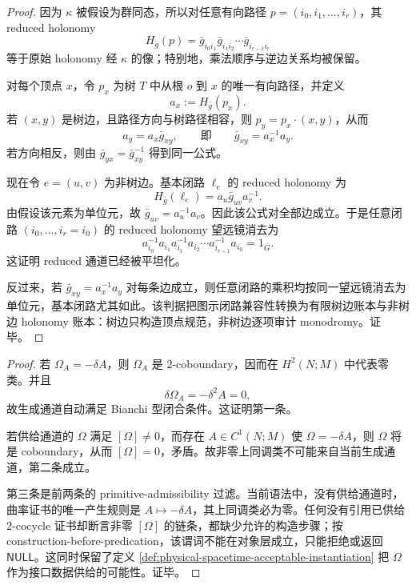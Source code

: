 \begin{proof}
因为 \(\kappa\) 被假设为群同态，所以对任意有向路径 \(p=(i_0,i_1,\ldots,i_r)\)，其 reduced holonomy
\[
H_{\bar g}(p)=\bar g_{i_0i_1}\bar g_{i_1i_2}\cdots \bar g_{i_{r-1}i_r}
\]
等于原始 holonomy 经 \(\kappa\) 的像；特别地，乘法顺序与逆边关系均被保留。

对每个顶点 \(x\)，令 \(p_x\) 为树 \(T\) 中从根 \(o\) 到 \(x\) 的唯一有向路径，并定义
\[
a_x:=H_{\bar g}(p_x).
\]
若 \((x,y)\) 是树边，且路径方向与树路径相容，则 \(p_y=p_x\cdot(x,y)\)，从而
\[
a_y=a_x\bar g_{xy},\qquad\text{即}\qquad \bar g_{xy}=a_x^{-1}a_y.
\]
若方向相反，则由 \(\bar g_{yx}=\bar g_{xy}^{-1}\) 得到同一公式。

现在令 \(e=(u,v)\) 为非树边。基本闭路 \(\ell_e\) 的 reduced holonomy 为
\[
H_{\bar g}(\ell_e)=a_u\bar g_{uv}a_v^{-1}.
\]
由假设该元素为单位元，故 \(\bar g_{uv}=a_u^{-1}a_v\)。因此该公式对全部边成立。于是任意闭路 \((i_0,\ldots,i_r=i_0)\) 的 reduced holonomy 望远镜消去为
\[
a_{i_0}^{-1}a_{i_1}a_{i_1}^{-1}a_{i_2}\cdots a_{i_{r-1}}^{-1}a_{i_0}=1_{\overline G}.
\]
这证明 reduced 通道已经被平坦化。

反过来，若 \(\bar g_{xy}=a_x^{-1}a_y\) 对每条边成立，则任意闭路的乘积均按同一望远镜消去为单位元，基本闭路尤其如此。该判据把图示闭路兼容性转换为有限树边账本与非树边 holonomy 账本：树边只构造顶点规范，非树边逐项审计 monodromy。证毕。
\end{proof}

\begin{proof}
若 \(\Omega_A=-\delta A\)，则 \(\Omega_A\) 是 \(2\)-coboundary，因而在 \(H^2(N;M)\) 中代表零类。并且
\[
\delta\Omega_A=-\delta^2A=0,
\]
故生成通道自动满足 Bianchi 型闭合条件。这证明第一条。

若供给通道的 \(\Omega\) 满足 \([\Omega]\ne0\)，而存在 \(A\in C^1(N;M)\) 使 \(\Omega=-\delta A\)，则 \(\Omega\) 将是 coboundary，从而 \([\Omega]=0\)，矛盾。故非零上同调类不可能来自当前生成通道，第二条成立。

第三条是前两条的 primitive-admissibility 过滤。当前语法中，没有供给通道时，曲率证书的唯一产生规则是 \(A\mapsto -\delta A\)，其上同调类必为零。任何没有引用已供给 \(2\)-cocycle 证书却断言非零 \([\Omega]\) 的链条，都缺少允许的构造步骤；按 construction-before-predication，该谓词不能在对象层成立，只能拒绝或返回 \(\mathsf{NULL}\)。这同时保留了定义 \ref{def:physical-spacetime-acceptable-instantiation} 把 \(\Omega\) 作为接口数据供给的可能性。证毕。
\end{proof}

